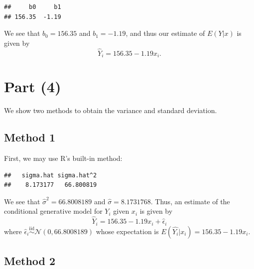 \documentclass[
]{article}
\newenvironment{Shaded}{\begin{snugshade}}{\end{snugshade}}
\newcommand{\DecValTok}[1]{\textcolor[rgb]{0.00,0.00,0.81}{#1}}
\newcommand{\FunctionTok}[1]{\textcolor[rgb]{0.13,0.29,0.53}{\textbf{#1}}}
\newcommand{\NormalTok}[1]{#1}
\newcommand{\OtherTok}[1]{\textcolor[rgb]{0.56,0.35,0.01}{#1}}
\newcommand{\SpecialCharTok}[1]{\textcolor[rgb]{0.81,0.36,0.00}{\textbf{#1}}}
\newcommand{\StringTok}[1]{\textcolor[rgb]{0.31,0.60,0.02}{#1}}
\begin{document}
\begin{verbatim}
##     b0     b1 
## 156.35  -1.19
\end{verbatim}

We see that \(b_0 = 156.35\) and \(b_1 = -1.19\), and thus our estimate
of \(E(Y|x)\) is given by \[
  \hat{Y}_i = 156.35 - 1.19 x_i.
\]

\hypertarget{part-4}{%
\section{Part (4)}\label{part-4}}


We show two methods to obtain the variance and standard deviation.

\hypertarget{method-1}{%
\subsection{Method 1}\label{method-1}}

First, we may use R's built-in method:

\begin{Shaded}
\end{Shaded}

\begin{verbatim}
##   sigma.hat sigma.hat^2 
##    8.173177   66.800819
\end{verbatim}

We see that \(\hat\sigma^2 = 66.8008189\) and
\(\hat\sigma = 8.1731768\). Thus, an estimate of the conditional
generative model for \(Y_i\) given \(x_i\) is given by \[
  \hat{Y}_i = 156.35 - 1.19 x_i + \hat\epsilon_i
\] where
\(\hat\epsilon_i \stackrel{\text{iid}}{\sim} \mathcal{N}(0,66.8008189)\)
whose expectation is \(E(\hat{Y_i}|x_i) = 156.35 - 1.19 x_i\).

\hypertarget{method-2}{%
\subsection{Method 2}\label{method-2}}
\end{document}
